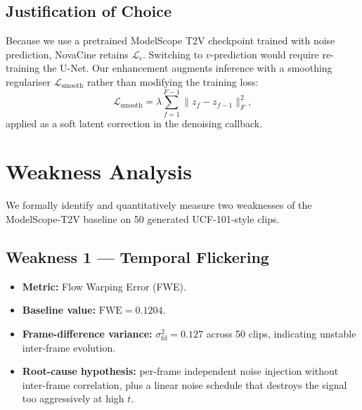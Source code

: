 \documentclass[conference]{IEEEtran}
\begin{document}
\subsection{Justification of Choice}
Because we use a pretrained ModelScope T2V checkpoint trained with
noise prediction, NovaCine retains $\mathcal{L}_\epsilon$. Switching
to $v$-prediction would require re-training the U-Net.
Our enhancement augments inference with a smoothing regulariser
$\mathcal{L}_{\text{smooth}}$ rather than modifying the training loss:
\begin{equation}
\label{eq:smooth}
\mathcal{L}_{\text{smooth}} = \lambda \sum_{f=1}^{F-1} \|z_f - z_{f-1}\|_F^2,
\end{equation}
applied as a soft latent correction in the denoising callback.

\section{Weakness Analysis}

We formally identify and quantitatively measure two weaknesses
of the ModelScope-T2V baseline on 50 generated UCF-101-style clips.

\subsection{Weakness 1 --- Temporal Flickering}
\begin{itemize}
  \item \textbf{Metric:} Flow Warping Error (FWE).
  \item \textbf{Baseline value:} $\text{FWE} = 0.1204$.
  \item \textbf{Frame-difference variance:} $\sigma^2_{\text{fd}} = 0.127$
        across 50 clips, indicating unstable inter-frame evolution.
  \item \textbf{Root-cause hypothesis:} per-frame independent noise
        injection without inter-frame correlation, plus a linear
        noise schedule that destroys the signal too aggressively
        at high $t$.
\end{itemize}
\end{document}
